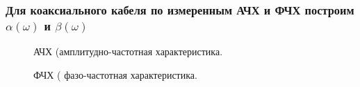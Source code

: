 \documentclass[12pt]{article}
\begin{document}
\begin{flushleft}
\subsubsection{Для коаксиального кабеля по измеренным АЧХ и ФЧХ построим $\alpha (\omega)$ и $\beta (\omega)$}
\begin{figure}[!h]
\caption{АЧХ (амплитудно-частотная характеристика.}
\label{ris:image}
\end{figure}
\begin{figure}[!h]
\caption{ФЧХ ( фазо-частотная характеристика.}
\label{ris:image}
\end{figure}

\end{flushleft}
\end{document}
